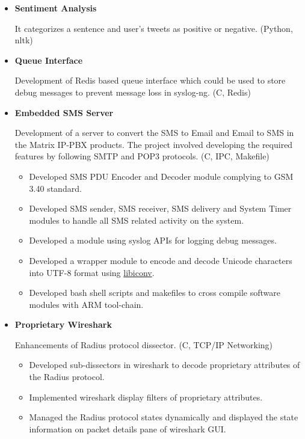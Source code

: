 \documentclass[letterpaper,11pt]{article}
\newcommand{\resitem}[1]{\item #1 \vspace{-2pt}}
\begin{document}
\begin{itemize}
\item
    \textbf{Sentiment Analysis} 
    
    It categorizes a sentence and user's tweets as positive or negative. (Python, nltk)

\item
    \textbf{Queue Interface} 
    
    Development of Redis based queue interface which could be used to store debug messages to prevent message loss in syslog-ng. (C, Redis)

\item
    \textbf{Embedded SMS Server}
    
    Development of a server to convert the SMS to Email and Email to SMS in the Matrix IP-PBX products. The project involved developing the required features by following SMTP and POP3 protocols. (C, IPC, Makefile)
    \vspace{-8pt}

	\begin{itemize}
		\resitem{Developed SMS PDU Encoder and Decoder module complying to GSM 3.40 standard.}
		
		\resitem{Developed SMS sender, SMS receiver, SMS delivery and System Timer modules to handle all SMS related activity on the system.}
	  	
	  	\resitem{Developed a module using syslog APIs for logging debug messages.}

	    \resitem{Developed a wrapper module to encode and decode Unicode characters into UTF-8 format using \href{https://github.com/bnoordhuis/libiconv}{libiconv}.}
        
        \resitem{Developed bash shell scripts and makefiles to cross compile software modules with ARM tool-chain.}
		
	\end{itemize}
    
\item
    \textbf{Proprietary Wireshark}
    
    Enhancements of Radius protocol dissector. (C, TCP/IP Networking)
    \vspace{-8pt}

	\begin{itemize}
	    \resitem{Developed sub-dissectors in wireshark to decode proprietary attributes of the Radius protocol.}
	    \resitem{Implemented wireshark display filters of proprietary attributes.}
	    \resitem{Managed the Radius protocol states dynamically and displayed the state information on packet details pane of wireshark GUI.}
	   	\end{itemize}


\end{itemize}
\end{document}

